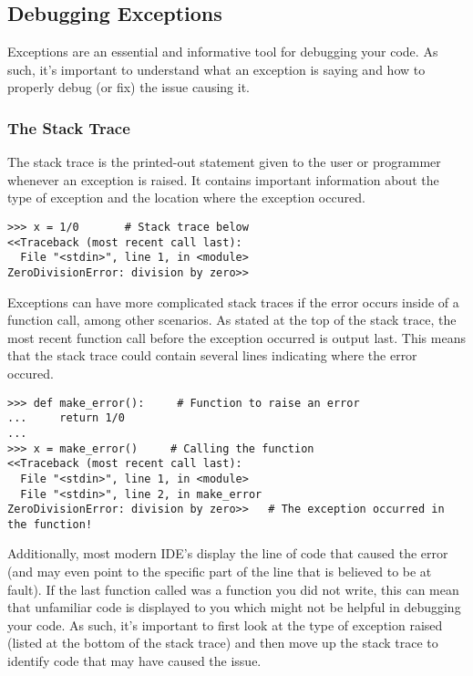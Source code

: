 \subsection*{Debugging Exceptions} %

Exceptions are an essential and informative tool for debugging your code.
As such, it's important to understand what an exception is saying and how to properly debug (or fix) the issue causing it.

\subsubsection*{The Stack Trace} %

The stack trace is the printed-out statement given to the user or programmer whenever an exception is raised.
It contains important information about the type of exception and the location where the exception occured.

\begin{lstlisting}
>>> x = 1/0       # Stack trace below
<<Traceback (most recent call last):
  File "<stdin>", line 1, in <module>
ZeroDivisionError: division by zero>>
\end{lstlisting}

Exceptions can have more complicated stack traces if the error occurs inside of a function call, among other scenarios.
As stated at the top of the stack trace, the most recent function call before the exception occurred is output last.
This means that the stack trace could contain several lines indicating where the error occured.

\begin{lstlisting}
>>> def make_error():     # Function to raise an error
...     return 1/0
...
>>> x = make_error()     # Calling the function
<<Traceback (most recent call last):
  File "<stdin>", line 1, in <module>
  File "<stdin>", line 2, in make_error
ZeroDivisionError: division by zero>>   # The exception occurred in the function!
\end{lstlisting}

Additionally, most modern IDE's display the line of code that caused the error (and may even point to the specific part of the line that is believed to be at fault).
If the last function called was a function you did not write, this can mean that unfamiliar code is displayed to you which might not be helpful in debugging your code.
As such, it's important to first look at the type of exception raised (listed at the bottom of the stack trace) and then move up the stack trace to identify code that may have caused the issue.

